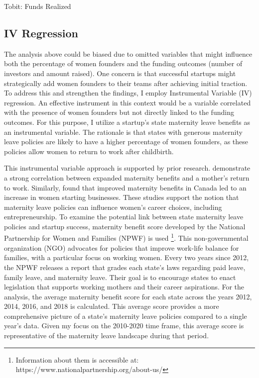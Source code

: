 \begin{table}[H]
 \captionsetup{justification=raggedright,singlelinecheck=false}
    \caption{Tobit: Funds Realized}
        
\end{table}


\subsection{IV Regression}
The analysis above could be biased due to omitted variables that might influence both the percentage of women founders and the funding outcomes (number of investors and amount raised).  One concern is that successful startups might strategically add women founders to their teams after achieving initial traction. To address this and strengthen the findings, I employ Instrumental Variable (IV) regression. An effective instrument in this context would be a variable correlated with the presence of women founders but not directly linked to the funding outcomes. For this purpose, I utilize a startup's state maternity leave benefits as an instrumental variable. The rationale is that states with generous maternity leave policies are likely to have a higher percentage of women founders, as these policies allow women to return to work after childbirth.

This instrumental variable approach is supported by prior research. \cite{dustmann2012} demonstrate a strong correlation between expanded maternity benefits and a mother's return to work. Similarly, \cite{gottlieb2022} found that improved maternity benefits in Canada led to an increase in women starting businesses.  These studies support the notion that maternity leave policies can influence women's career choices, including entrepreneurship. To examine the potential link between state maternity leave policies and startup success, maternity benefit score developed by the National Partnership for Women and Families (NPWF) is used \footnote[4]{Information about them is accessible at: https://www.nationalpartnership.org/about-us/}. This non-governmental organization (NGO) advocates for policies that improve work-life balance for families, with a particular focus on working women. Every two years since 2012, the NPWF releases a report that grades each state's laws regarding paid leave, family leave, and maternity leave. Their goal is to encourage states to enact legislation that supports working mothers and their career aspirations. For the analysis, the average maternity benefit score for each state across the years 2012, 2014, 2016, and 2018 is calculated. This average score provides a more comprehensive picture of a state's maternity leave policies compared to a single year's data. Given my focus on the 2010-2020 time frame, this average score is representative of the maternity leave landscape during that period.

